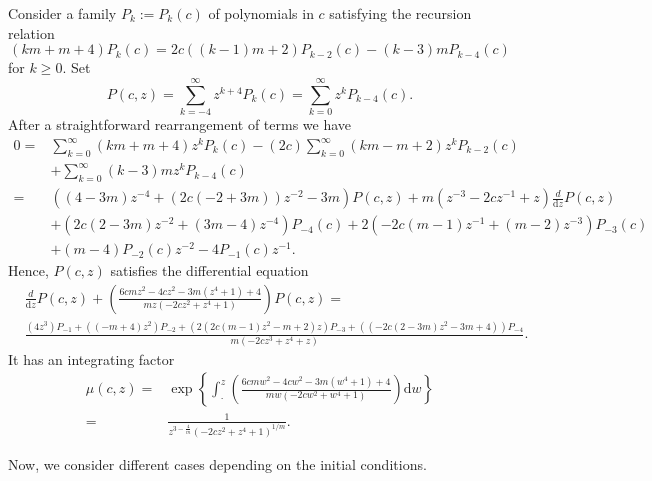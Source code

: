 \documentclass[review,nopreprintline]{elsarticle}
\theoremstyle{definition}
\numberwithin{equation}{section}
\theoremstyle{remark}
\begin{document}
	    Consider a family $P_k:=P_k(c)$ of polynomials in $c$ satisfying the recursion relation
	    \begin{equation}
	        (k m+m+4) P_k(c)=2 c ((k-1) m+2) P_{k-2}(c)-(k-3) m P_{k-4}(c)
	    \end{equation}
	    for $k\geq 0$. Set
	    \begin{equation*}
	        P(c,z)=\sum _{k=-4}^{\infty } z^{k+4} P_k(c)=\sum _{k=0}^{\infty } z^{k} P_{k-4}(c).
	    \end{equation*}
	    After a straightforward rearrangement of terms we have
	    \begin{align*}
	        0=&\sum _{k=0}^{\infty } (k m+m+4) z^k P_k(c)-(2 c) \sum _{k=0}^{\infty } (k m-m+2) z^k P_{k-2}(c) \\ 
	        & +\sum _{k=0}^{\infty } (k-3) m z^k P_{k-4}(c)\\= 
	        & ((4 - 3 m)z^{-4} + (2 c (-2 + 3 m)) z^{-2} - 3 m) P(c,z) + m \left(z^{-3}-2cz^{-1}+z \right)\frac{d}{\textrm{d}z} P(c,z) \\
	        &+ \left(2 c (2-3 m) z^{-2}+(3 m-4)z^{-4}\right)P_{-4}(c) + 2 \left(-2 c (m-1) z^{-1}+(m-2)z^{-3}\right)P_{-3}(c) \\
	        &+ (m-4) P_{-2}(c)z^{-2}-4 P_{-1}(c) z^{-1}.
	    \end{align*}
	    Hence, $P(c, z)$ satisfies the differential equation
	    \begin{align}
	        &\frac{d}{\textrm{d}z}P(c,z)+\left(\frac{6 c m z^2-4 c z^2-3 m \left(z^4+1\right)+4}{m z \left(-2 c z^2+z^4+1\right)}\right)P(c,z)=& \nonumber
	        \\&\frac{(4  z^3) P_{-1} + ((-m+4)z^2) P_{-2}+ (2\left(2 c (m-1) z^2-m+2\right)z) P_{-3} +({ \left(-2 c (2-3 m) z^2-3 m+4\right)})P_{-4}}{m \left(-2 c z^3+z^4+z\right)}.
	    \end{align}
	    It has an integrating factor
	    \begin{align*}
	        \mu(c,z)=&\exp{\left\{\int_{\cdot}^z \left(\frac{6 c m w^2-4 c w^2-3 m \left(w^4+1\right)+4}{m w \left(-2 c w^2+w^4+1\right)}\right) \textrm{d}w\right\}} \\
	        =& \frac{1}{z^{3-\frac{4}{m}}(-2 c z^2+z^4+1)^{1/m}}.
	    \end{align*}
	    
	    Now, we consider different cases depending on the initial conditions.\\
\end{document}
